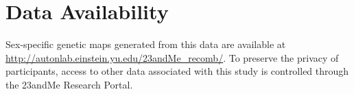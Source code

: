 \section{Data Availability}

Sex-specific genetic maps generated from this data are available at  
\url{http://autonlab.einstein.yu.edu/23andMe_recomb/}. To preserve the privacy of  
participants, access to other data associated with this study is controlled through  
the 23andMe Research Portal\cite{23andMe2013}.

\renewcommand{\bibname}{Supplementary References}

\begingroup
    \setlength{\bibsep}{10pt}
    \linespread{1}\selectfont
    
\endgroup

\beginmain







